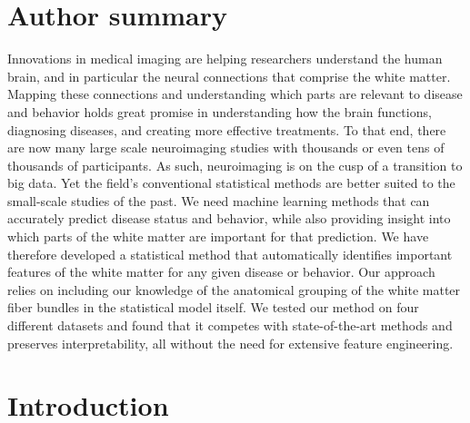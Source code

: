\documentclass[10pt,letterpaper]{article}
\begin{document}
\section*{Author summary}
Innovations in medical imaging are helping researchers understand the human
brain, and in particular the neural connections that comprise the white
matter. Mapping these connections and understanding which parts are relevant
to disease and behavior holds great promise in understanding how the brain
functions, diagnosing diseases, and creating more effective treatments. To
that end, there are now many large scale neuroimaging studies with thousands
or even tens of thousands of participants. As such, neuroimaging is on the
cusp of a transition to big data. Yet the field's conventional statistical
methods are better suited to the small-scale studies of the past. We need
machine learning methods that can accurately predict disease status and
behavior, while also providing insight into which parts of the white matter
are important for that prediction. We have therefore developed a statistical
method that automatically identifies important features of the white matter
for any given disease or behavior. Our approach relies on including our
knowledge of the anatomical grouping of the white matter fiber bundles in the
statistical model itself. We tested our method on four different datasets and
found that it competes with state-of-the-art methods and preserves
interpretability, all without the need for extensive feature engineering.

\linenumbers

\section*{Introduction}
\end{document}
